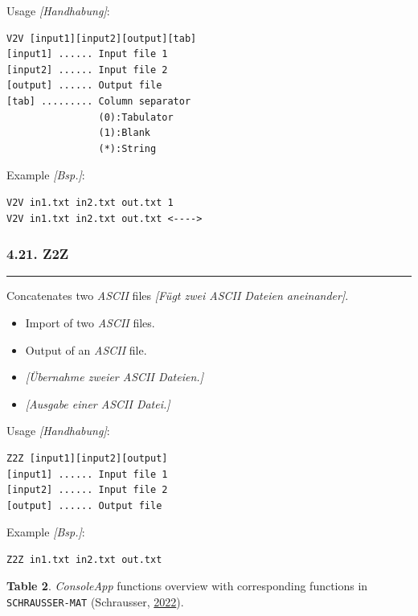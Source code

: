\documentclass[
]{article}
\begin{document}
Usage \emph{{[}Handhabung{]}}:

\begin{verbatim}
V2V [input1][input2][output][tab] 
[input1] ...... Input file 1 
[input2] ...... Input file 2 
[output] ...... Output file 
[tab] ......... Column separator
                (0):Tabulator 
                (1):Blank 
                (*):String
\end{verbatim}

Example \emph{{[}Bsp.{]}}:

\begin{verbatim}
V2V in1.txt in2.txt out.txt 1
V2V in1.txt in2.txt out.txt <---->
\end{verbatim}

\hypertarget{z2z}{%
\subsubsection{4.21. Z2Z}\label{z2z}}

\begin{center}\rule{0.5\linewidth}{0.5pt}\end{center}

Concatenates two \emph{ASCII} files \emph{{[}Fügt zwei ASCII Dateien
aneinander{]}}.

\begin{itemize}
\item
  Import of two \emph{ASCII} files.
\item
  Output of an \emph{ASCII} file.
\item
  \emph{{[}Übernahme zweier ASCII Dateien.{]}}
\item
  \emph{{[}Ausgabe einer ASCII Datei.{]}}
\end{itemize}

Usage \emph{{[}Handhabung{]}}:

\begin{verbatim}
Z2Z [input1][input2][output] 
[input1] ...... Input file 1 
[input2] ...... Input file 2 
[output] ...... Output file 
\end{verbatim}

Example \emph{{[}Bsp.{]}}:

\begin{verbatim}
Z2Z in1.txt in2.txt out.txt
\end{verbatim}

\textbf{Table 2}. \emph{ConsoleApp} functions overview with
corresponding functions in \texttt{SCHRAUSSER-MAT} (Schrausser,
\href{https://doi.org/10.17605/OSF.IO/8XE42}{2022}).
\end{document}
